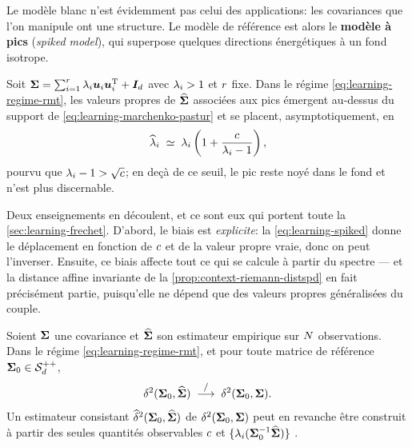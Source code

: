 Le modèle blanc n'est évidemment pas celui des applications: les covariances
que l'on manipule ont une structure. Le modèle de référence est alors le
\textbf{modèle à pics} (\emph{spiked model}), qui superpose quelques directions
énergétiques à un fond isotrope.

\begin{property}
\label{prop:learning-spiked}
  Soit $\boldsymbol{\Sigma}=\sum_{i=1}^{r}\lambda_i\boldsymbol{u}_i\boldsymbol{u}_i^{\mathrm{T}}+\boldsymbol{I}_{d}$
  avec $\lambda_i>1$ et $r$ fixe. Dans le régime
  \cref{eq:learning-regime-rmt}, les valeurs propres de $\widehat{\boldsymbol{\Sigma}}$ associées aux
  pics émergent au-dessus du support de
  \cref{eq:learning-marchenko-pastur} et se placent, asymptotiquement, en
  \begin{equation}
    \widehat{\lambda}_i
    \;\simeq\;
    \lambda_i\left(1+\frac{c}{\lambda_i-1}\right),
    \label{eq:learning-spiked}
  \end{equation}
  pourvu que $\lambda_i-1>\sqrt{c}$; en deçà de ce seuil, le pic reste
  noyé dans le fond et n'est plus discernable.
\end{property}

Deux enseignements en découlent, et ce sont eux qui portent toute la
\cref{sec:learning-frechet}. D'abord, le biais est \emph{explicite}: la
\cref{eq:learning-spiked} donne le déplacement en fonction de $c$ et de
la valeur propre vraie, donc on peut l'inverser. Ensuite, ce biais affecte tout
ce qui se calcule à partir du spectre --- et la distance affine invariante de
la \cref{prop:context-riemann-distspd} en fait précisément partie, puisqu'elle
ne dépend que des valeurs propres généralisées du couple.

\begin{property}
\label{prop:learning-distance-biaisee}
  Soient $\boldsymbol{\Sigma}$ une covariance et $\widehat{\boldsymbol{\Sigma}}$ son estimateur empirique sur $N$
  observations. Dans le régime \cref{eq:learning-regime-rmt}, et pour toute
  matrice de référence $\boldsymbol{\Sigma}_0\in\mathcal{S}_{d}^{++}$,
  \begin{equation}
    \delta^2(\boldsymbol{\Sigma}_0,\widehat{\boldsymbol{\Sigma}})
    \;\overset{\text{\footnotesize/}}{\longrightarrow}\;
    \delta^2(\boldsymbol{\Sigma}_0,\boldsymbol{\Sigma}).
    \label{eq:learning-distance-biaisee}
  \end{equation}
  Un estimateur consistant $\widehat{\delta}^2(\boldsymbol{\Sigma}_0,\widehat{\boldsymbol{\Sigma}})$ de $\delta^2(\boldsymbol{\Sigma}_0,\boldsymbol{\Sigma})$
  peut en revanche être construit à partir des seules quantités observables
  $c$ et $\{\lambda_i(\boldsymbol{\Sigma}_0^{-1}\widehat{\boldsymbol{\Sigma}})\}$
  .
\end{property}

